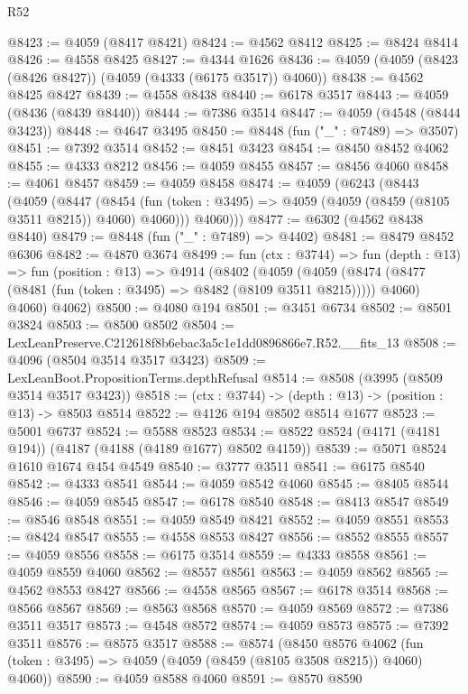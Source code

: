 \begin{lexlean}{R52}
\begin{coremodule}
@8423 := @4059 (@8417 @8421)
@8424 := @4562 @8412
@8425 := @8424 @8414
@8426 := @4558 @8425
@8427 := @4344 @1626
@8436 := @4059 (@4059 (@8423 (@8426 @8427)) (@4059 (@4333 (@6175 @3517)) @4060))
@8438 := @4562 @8425 @8427
@8439 := @4558 @8438
@8440 := @6178 @3517
@8443 := @4059 (@8436 (@8439 @8440))
@8444 := @7386 @3514
@8447 := @4059 (@4548 (@8444 @3423))
@8448 := @4647 @3495
@8450 := @8448 (fun ("_" : @7489) => @3507)
@8451 := @7392 @3514
@8452 := @8451 @3423
@8454 := @8450 @8452 @4062
@8455 := @4333 @8212
@8456 := @4059 @8455
@8457 := @8456 @4060
@8458 := @4061 @8457
@8459 := @4059 @8458
@8474 := @4059
    (@6243
      (@8443
        (@4059
          (@8447
            (@8454 (fun (token : @3495) => @4059 (@4059 (@8459 (@8105 @3511 @8215)) @4060) @4060)))
          @4060)))
@8477 := @6302 (@4562 @8438 @8440)
@8479 := @8448 (fun ("_" : @7489) => @4402)
@8481 := @8479 @8452 @6306
@8482 := @4870 @3674
@8499 := fun (ctx : @3744) =>
  fun (depth : @13) =>
  fun (position : @13) =>
  @4914
    (@8402
      (@4059
        (@4059 (@8474 (@8477 (@8481 (fun (token : @3495) => @8482 (@8109 @3511 @8215))))) @4060)
        @4060)
      @4062)
@8500 := @4080 @194
@8501 := @3451 @6734
@8502 := @8501 @3824
@8503 := @8500 @8502
@8504 := LexLeanPreserve.C212618f8b6ebac3a5c1e1dd0896866e7.R52.__fits_13
@8508 := @4096 (@8504 @3514 @3517 @3423)
@8509 := LexLeanBoot.PropositionTerms.depthRefusal
@8514 := @8508 (@3995 (@8509 @3514 @3517 @3423))
@8518 := (ctx : @3744) -> (depth : @13) -> (position : @13) -> @8503 @8514
@8522 := @4126 @194 @8502 @8514 @1677
@8523 := @5001 @6737
@8524 := @5588 @8523
@8534 := @8522 @8524 (@4171 (@4181 @194)) (@4187 (@4188 (@4189 @1677) @8502 @4159))
@8539 := @5071 @8524 @1610 @1674 @454 @4549
@8540 := @3777 @3511
@8541 := @6175 @8540
@8542 := @4333 @8541
@8544 := @4059 @8542 @4060
@8545 := @8405 @8544
@8546 := @4059 @8545
@8547 := @6178 @8540
@8548 := @8413 @8547
@8549 := @8546 @8548
@8551 := @4059 @8549 @8421
@8552 := @4059 @8551
@8553 := @8424 @8547
@8555 := @4558 @8553 @8427
@8556 := @8552 @8555
@8557 := @4059 @8556
@8558 := @6175 @3514
@8559 := @4333 @8558
@8561 := @4059 @8559 @4060
@8562 := @8557 @8561
@8563 := @4059 @8562
@8565 := @4562 @8553 @8427
@8566 := @4558 @8565
@8567 := @6178 @3514
@8568 := @8566 @8567
@8569 := @8563 @8568
@8570 := @4059 @8569
@8572 := @7386 @3511 @3517
@8573 := @4548 @8572
@8574 := @4059 @8573
@8575 := @7392 @3511
@8576 := @8575 @3517
@8588 := @8574
    (@8450
      @8576
      @4062
      (fun (token : @3495) => @4059 (@4059 (@8459 (@8105 @3508 @8215)) @4060) @4060))
@8590 := @4059 @8588 @4060
@8591 := @8570 @8590

\end{coremodule}
\end{lexlean}
